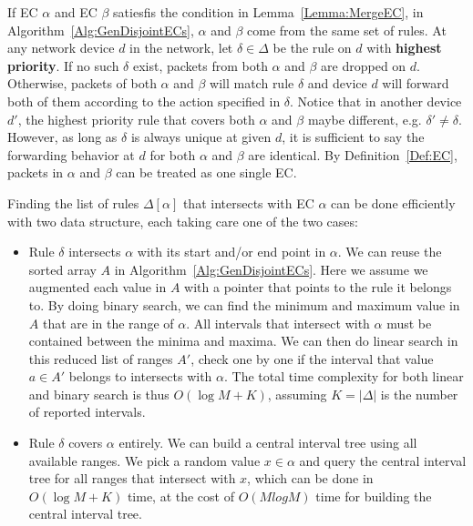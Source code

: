 If EC $\alpha$ and EC $\beta$ satiesfis the condition in Lemma~\ref{Lemma:MergeEC},
in Algorithm~\ref{Alg:GenDisjointECs}, $\alpha$ and $\beta$ come from
the same set of rules.
At any network device $d$ in the network, let $\delta \in \Delta$ be the rule on $d$ with
\textbf{highest priority}.
If no such $\delta$ exist, packets from both $\alpha$ and $\beta$ are dropped on $d$.
Otherwise, packets of both $\alpha$ and $\beta$ will match rule $\delta$ and
device $d$ will forward both of them according to the action specified in $\delta$.
Notice that in another device $d'$, the highest priority rule that covers both $\alpha$
and $\beta$ maybe different, e.g. $\delta' \neq \delta$.
However, as long as $\delta$ is always unique at given $d$,
it is sufficient to say the forwarding behavior at $d$ for both $\alpha$ and $\beta$ are identical.
By Definition~\ref{Def:EC},
packets in $\alpha$ and $\beta$ can be treated as one single EC.

Finding the list of rules $\Delta[\alpha]$ that intersects with EC $\alpha$ can be done
efficiently with two data structure,
each taking care one of the two cases\cite{FindIntersectionWiki}:
\begin{itemize}
\item Rule $\delta$ intersects $\alpha$ with its start and/or end point in $\alpha$.
        We can reuse the sorted array $A$ in Algorithm~\ref{Alg:GenDisjointECs}.
        Here we assume we augmented each value in $A$ with a pointer that points to
        the rule it belongs to.
        By doing binary search, we can find the minimum and maximum value in $A$ that
        are in the range of $\alpha$.
        All intervals that intersect with $\alpha$ must be contained between
        the minima and maxima.
        We can then do linear search in this reduced list of ranges $A'$,
        check one by one if the interval that value $a\in A'$ belongs to
        intersects with $\alpha$.
        The total time complexity for both linear and binary search is thus $O(\log M + K)$,
        assuming $K=|\Delta|$ is the number of reported intervals.
\item Rule $\delta$ covers $\alpha$ entirely. We can build
        a central interval tree\cite{ComputationalGeometryBook} using all available ranges.
        We pick a random value $x \in \alpha$ and query the central interval tree for
        all ranges that intersect with $x$, which can be done in $O(\log M + K)$ time,
        at the cost of $O(M log M)$ time for building the central interval tree. 
\end{itemize}

